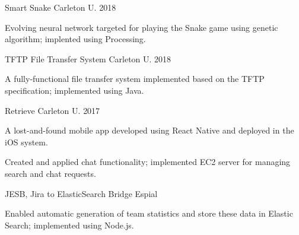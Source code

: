 \begin{cventries}

\cventry
{\textnormal{}}
{Smart Snake}
{Carleton U.}
{2018}
{\begin{cvitems}
    \item {Evolving neural network targeted for playing the Snake game using genetic algorithm; implented using Processing.}
\end{cvitems}}

\cventry
{\textnormal{}}
{TFTP File Transfer System}
{Carleton U.}
{2018}
{\begin{cvitems}
    \item {A fully-functional file transfer system implemented based on the TFTP specification; implemented using Java.}
\end{cvitems}}

\cventry
{\textnormal{}}
{Retrieve}
{Carleton U.}
{2017}
{\begin{cvitems}
    \item {A lost-and-found mobile app developed using React Native and deployed in the iOS system.}
    \item {Created and applied chat functionality; implemented EC2 server for managing search and chat requests.}
\end{cvitems}}

\cvshortentry
{JESB, Jira to ElasticSearch Bridge}
{Espial}
{\begin{cvitems}
    \item {Enabled automatic generation of team statistics and store these data in Elastic Search; implemented using Node.js.}
\end{cvitems}}

\end{cventries}
